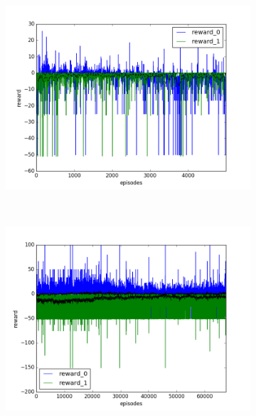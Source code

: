 \begin{figure}[t]
  \vspace{\graphspacing}
  \begin{subfigure}[t]{\figscale\linewidth}
    \hspace*{-2.75cm}
    \includegraphics[width=1.5\textwidth]
    {../results/dqn_1vs1/reward.png}
    \label{fig:dqn-1vs1-reward}
  \end{subfigure}
  ~
  \begin{subfigure}[t]{\figscale\linewidth}
    \hspace*{-1.4cm}
    \includegraphics[width=1.5\textwidth]
    {../results/ddpg_1vs1/reward.png}
    \label{fig:ddpg-1vs1-reward}
  \end{subfigure}
  ~
  \begin{subfigure}[t]{\figscale\linewidth}

\end{subfigure}
\end{figure}
